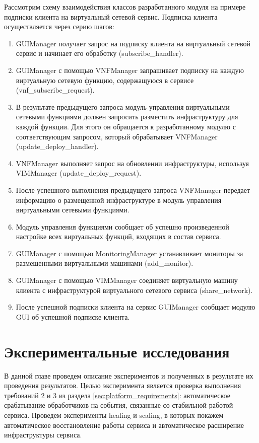 \documentclass[oneside,final,14pt,a4paper]{extreport}
\begin{document}
Рассмотрим схему взаимодействия классов разработанного модуля на примере подписки клиента на виртуальный сетевой сервис. Подписка клиента осуществляется через серию шагов:
\begin{enumerate}
	\item GUIManager получает запрос на подписку клиента на виртуальный сетевой сервис и начинает его обработку (subscribe\_handler).
	\item GUIManager с помощью VNFManager запрашивает подписку на каждую виртуальную сетевую функцию, содержащуюся в сервисе (vnf\_subscribe\_request).
	\item В результате предыдущего запроса модуль управления виртуальными сетевыми функциями должен запросить разместить инфраструктуру для каждой функции. Для этого он обращается к разработанному модулю с соответствующим запросом, который обрабатывает VNFManager (update\_deploy\_handler).
	\item VNFManager выполняет запрос на обновлении инфраструктуры, используя VIMManager (update\_deploy\_request).
	\item После успешного выполнения предыдущего запроса VNFManager передает информацию о размещенной инфраструктуре в модуль управления виртуальными сетевыми функциями.
	\item Модуль управления функциями сообщает об успешно произведенной настройке всех виртуальных функций, входящих в состав сервиса.
	\item GUIManager с помощью MonitoringManager устанавливает мониторы за размещенными виртуальными машинами (add\_monitor). 
	\item GUIManager с помощью VIMManager соединяет виртуальную машину клиента с инфраструктурой виртуального сетевого сервиса (share\_network).
	\item После успешной подписки клиента на сервис GUIManager сообщает модулю GUI об успешной подписке клиента.
\end{enumerate}





\chapter{Экспериментальные исследования}
\label{chap:expirements}
В данной главе проведем описание экспериментов и полученных в результате их проведения результатов. Целью эксперимента является проверка выполнения требований 2 и 3 из раздела \ref{sec:platform_requirements}: автоматическое срабатывание обработчиков на события, связанные со стабильной работой сервиса. Проведем эксперименты healing и scaling, в которых покажем автоматическое восстановление работы сервиса и автоматическое расширение инфраструктуры сервиса.
\end{document}
